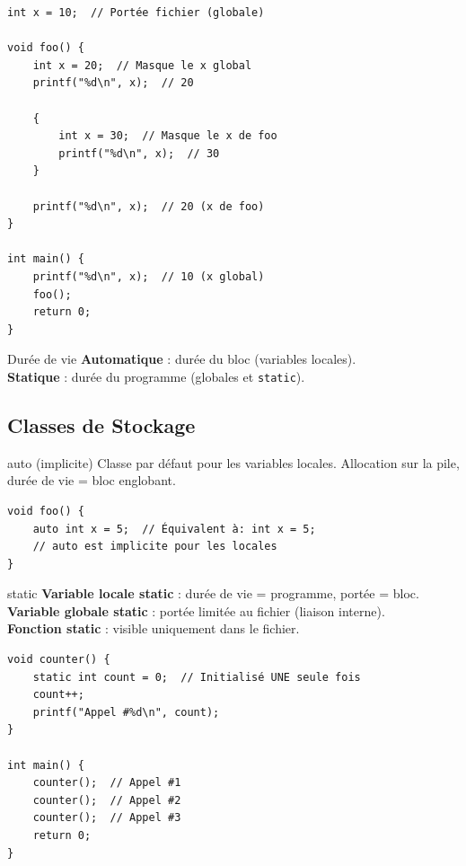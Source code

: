 \documentclass[10pt,a4paper]{article}
\begin{document}
\begin{lstlisting}[caption={Portée et masquage}]
int x = 10;  // Portée fichier (globale)

void foo() {
    int x = 20;  // Masque le x global
    printf("%d\n", x);  // 20
    
    {
        int x = 30;  // Masque le x de foo
        printf("%d\n", x);  // 30
    }
    
    printf("%d\n", x);  // 20 (x de foo)
}

int main() {
    printf("%d\n", x);  // 10 (x global)
    foo();
    return 0;
}
\end{lstlisting}

\begin{techbox}{Durée de vie}
\textbf{Automatique} : durée du bloc (variables locales).\\
\textbf{Statique} : durée du programme (globales et \texttt{static}).
\end{techbox}

\subsection{Classes de Stockage}

\begin{definitionbox}{auto (implicite)}
Classe par défaut pour les variables locales. Allocation sur la pile, durée de vie = bloc englobant.
\end{definitionbox}

\begin{lstlisting}[caption={auto (rarement écrit explicitement)}]
void foo() {
    auto int x = 5;  // Équivalent à: int x = 5;
    // auto est implicite pour les locales
}
\end{lstlisting}

\begin{definitionbox}{static}
\textbf{Variable locale static} : durée de vie = programme, portée = bloc.\\
\textbf{Variable globale static} : portée limitée au fichier (liaison interne).\\
\textbf{Fonction static} : visible uniquement dans le fichier.
\end{definitionbox}

\begin{lstlisting}[caption={static local : persistance entre appels}]
void counter() {
    static int count = 0;  // Initialisé UNE seule fois
    count++;
    printf("Appel #%d\n", count);
}

int main() {
    counter();  // Appel #1
    counter();  // Appel #2
    counter();  // Appel #3
    return 0;
}
\end{lstlisting}
\end{document}
